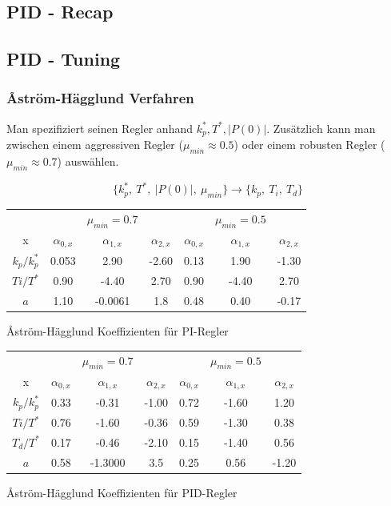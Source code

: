 \subsection{PID - Recap}
\subsection{PID - Tuning}
    \subsubsection{\r{A}ström-Hägglund Verfahren}
        Man spezifiziert seinen Regler anhand $k_p^*, T^*, |P(0)|$. Zusätzlich kann man zwischen einem aggressiven Regler ($\mu_{min} \approx 0.5$) oder einem robusten Regler ($\mu_{min} \approx 0.7$) auswählen.
        
        \[\{k_p^*,\ T^*,\ |P(0)|,\ \mu_{min}\} \rightarrow \{k_p,\ T_i,\ T_d\}\]
            \begin{center}
            \begin{tabular}{c|c c c|c c c}
                & & $\mu_{min} = 0.7$ & & &  $\mu_{min} = 0.5$ & \\ 
                x & $\alpha_{0,x}$ & $\alpha_{1,x}$ & $\alpha_{2,x}$ & $\alpha_{0,x}$ & $\alpha_{1,x}$ & $\alpha_{2,x}$ \\ \hline
                $k_p/k_p^*$  & 0.053 & 2.90 & -2.60 & 0.13 & 1.90 & -1.30 \\
                $Ti/T^*$ & 0.90 & -4.40 & 2.70 & 0.90 & -4.40 & 2.70\\ 
                $a$  &  1.10  &  -0.0061  &  1.8  &   0.48  &  0.40  &  -0.17\\
            \end{tabular}
            \r{A}ström-Hägglund Koeffizienten für PI-Regler

        
            \begin{tabular}{c|c c c|c c c}
                & & $\mu_{min} = 0.7$ & & &  $\mu_{min} = 0.5$ & \\ 
                x &
                $\alpha_{0,x}$ & $\alpha_{1,x}$ & $\alpha_{2,x}$ & $\alpha_{0,x}$ & $\alpha_{1,x}$ & $\alpha_{2,x}$ \\ \hline
                $k_p/k_p^*$  & 0.33 & -0.31 & -1.00 & 0.72 & -1.60 & 1.20 \\
                $Ti/T^*$ & 0.76 & -1.60 & -0.36 & 0.59 & -1.30 & 0.38 \\
                $T_d/T^*$ & 0.17 & -0.46 & -2.10 & 0.15 & -1.40 & 0.56\\
                $a$  &  0.58  &  -1.3000  &  3.5  &   0.25  &  0.56  &  -1.20\\
            \end{tabular}    
            \r{A}ström-Hägglund Koeffizienten für PID-Regler 
            
            \end{center}
            
